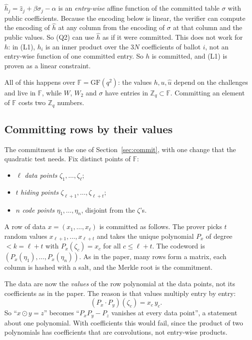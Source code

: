 \documentclass[11pt,a4paper]{article}
\newcommand{\Zq}{\mathbb{Z}_q}
\newcommand{\F}{\mathbb{F}}
\newcommand{\uh}{\hat{u}}
\newcommand{\hh}{\hat{h}}
\newcommand{\zh}{\hat{z}}
\theoremstyle{definition}
\theoremstyle{plain}
\begin{document}
\begin{why}[Why is $\hh$ not committed?]
$\hh_j=\zh_j+\beta\sigma_j-\alpha$ is an \emph{entry-wise} affine function of the committed table
$\sigma$ with public coefficients. Because the encoding below is linear, the verifier can compute
the encoding of $\hh$ at any column from the encoding of $\sigma$ at that column and the public
values. So (Q2) can use $\hh$ as if it were committed. This does not work for $h$: in (L1), $h_i$
is an inner product over the $3N$ coefficients of ballot $i$, not an entry-wise function of one
committed entry. So $h$ is committed, and (L1) is proven as a linear constraint.
\end{why}

All of this happens over $\F=\mathrm{GF}(q^2)$: the values $h,u,\uh$ depend on the challenges and live
in $\F$, while $W$, $W_2$ and $\sigma$ have entries in $\Zq\subset\F$. Committing an element of $\F$
costs two $\Zq$ numbers.

\subsection{Committing rows by their values}

The commitment is the one of Section~\ref{sec:commit}, with one change that the quadratic test
needs. Fix distinct points of $\F$:
\begin{itemize}[leftmargin=1.3em]
\item $\ell$ \emph{data points} $\zeta_1,\dots,\zeta_\ell$;
\item $t$ \emph{hiding points} $\zeta_{\ell+1},\dots,\zeta_{\ell+t}$;
\item $n$ \emph{code points} $\eta_1,\dots,\eta_n$, disjoint from the $\zeta$'s.
\end{itemize}
A row of data $x=(x_1,\dots,x_\ell)$ is committed as follows. The prover picks $t$ random values
$x_{\ell+1},\dots,x_{\ell+t}$ and takes the unique polynomial $P_x$ of degree $<k=\ell+t$ with
$P_x(\zeta_c)=x_c$ for all $c\le\ell+t$. The codeword is $(P_x(\eta_1),\dots,P_x(\eta_n))$. As in
the paper, many rows form a matrix, each column is hashed with a salt, and the Merkle root is the
commitment.

The data are now the \emph{values} of the row polynomial at the data points, not its coefficients
as in the paper. The reason is that values multiply entry by entry:
\[
  (P_x\cdot P_y)(\zeta_c)=x_c\,y_c .
\]
So ``$x\odot y=z$'' becomes ``$P_x P_y-P_z$ vanishes at every data point'', a statement about one
polynomial. With coefficients this would fail, since the product of two polynomials has coefficients
that are convolutions, not entry-wise products.
\end{document}
